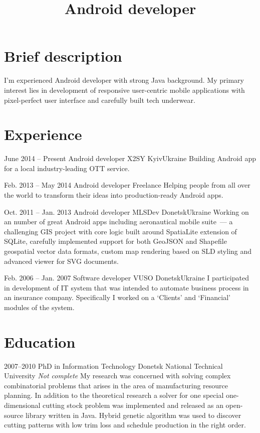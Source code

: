 \documentclass[11pt,a4paper,roman]{moderncv}
\title{Android developer}
\begin{document}
\makecvtitle

\section{Brief description}
\cvline
    {}
    {I'm experienced Android developer with strong Java background. My primary 
    interest lies in development of responsive user-centric mobile applications 
    with pixel-perfect user interface and carefully built tech underwear.}


\medskip
\section{Experience}

\cventry
    {June 2014 -- Present}
    {Android developer}
    {X2SY}
    {Kyiv}{Ukraine}
    {Building Android app for a local industry-leading OTT service.\newline}

\cventry
    {Feb. 2013 -- May 2014}
    {Android developer}
    {Freelance}
    {}{}
    {Helping people from all over the world to transform their ideas into 
    production-ready Android apps.\newline}

\cventry
    {Oct. 2011 -- Jan. 2013}
    {Android developer}
    {MLSDev}
    {Donetsk}{Ukraine}
    {Working on an number of great Android apps including aeronautical mobile 
    suite~--- a challenging GIS project with core logic built around SpatiaLite 
    extension of SQLite, carefully implemented support for both GeoJSON and 
    Shapefile geospatial vector data formats, custom map rendering based on SLD 
    styling and advanced viewer for SVG documents.\newline}

\cventry
    {Feb. 2006 -- Jan. 2007}
    {Software developer}
    {VUSO}
    {Donetsk}{Ukraine}
    {I participated in development of IT system that was intended to automate 
    business process in an insurance company. Specifically I worked on a 
    `Clients' and `Financial' modules of the system.}


\medskip
\section{Education}

\cventry
    {2007--2010}
    {PhD in Information Technology}
    {Donetsk National Technical University}
    {}
    {\newline\textit{Not complete}}
    {My research was concerned with solving complex combinatorial problems that
    arises in the area of manufacturing resource planning. In addition to the
    theoretical research a solver for one special one-dimensional cutting stock
    problem was implemented and released as an open-source library written in
    Java. Hybrid genetic algorithm was used to discover cutting patterns with
    low trim loss and schedule production in the right order.\newline}
    
\end{document}

